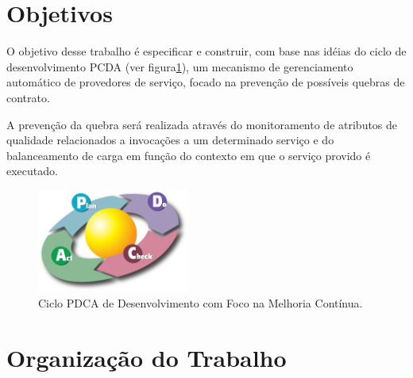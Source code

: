 \newpage
\section{Objetivos}

O objetivo desse trabalho é especificar e construir, com base nas idéias do ciclo de desenvolvimento PCDA (ver figura\ref{fig:pdca}), um mecanismo de gerenciamento automático de provedores de serviço, focado na prevenção de possíveis quebras de contrato.

A prevenção da quebra será realizada através do monitoramento de atributos de qualidade relacionados a invocações a um determinado serviço e do balanceamento de carga em função do contexto em que o serviço provido é executado.

\begin{figure}[htp]
\centering
\includegraphics[width=5cm]{chapters/intro/pdca_cycle.png}
\caption[Ciclo PDCA]{Ciclo PDCA de Desenvolvimento com Foco na Melhoria Contínua.}
\label{fig:pdca}
\end{figure}


\section{Organização do Trabalho}

